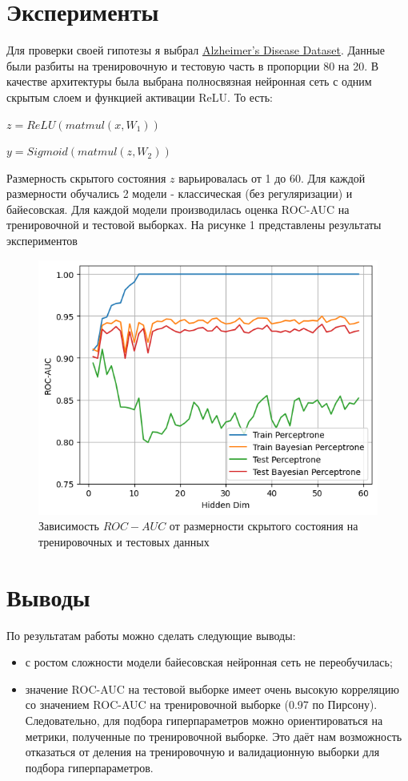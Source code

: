 \documentclass{article}
\begin{document}
\section{Эксперименты}

Для проверки своей гипотезы я выбрал \href{https://www.kaggle.com/datasets/rabieelkharoua/alzheimers-disease-dataset}{Alzheimer's Disease Dataset}. Данные были разбиты на тренировочную и тестовую часть в пропорции 80 на 20. В качестве архитектуры была выбрана полносвязная нейронная сеть с одним скрытым слоем и функцией активации ReLU. То есть:

$z = ReLU(matmul(x, W_1))$

$y = Sigmoid(matmul(z, W_2))$

Размерность скрытого состояния $z$ варьировалась от 1 до 60. Для каждой размерности обучались 2 модели - классическая (без регуляризации) и байесовская. Для каждой модели производилась оценка ROC-AUC на тренировочной и тестовой выборках. На рисунке 1 представлены результаты экспериментов

\begin{figure}
    \centering
    \includegraphics[width=1\linewidth]{roc_auc.png}
    \caption{Зависимость $ROC-AUC$ от размерности скрытого состояния на тренировочных и тестовых данных}
    \label{fig:enter-label}
\end{figure}

\section{Выводы}
По результатам работы можно сделать следующие выводы:
\begin{itemize}
    \item с ростом сложности модели байесовская нейронная сеть не переобучилась;
    \item значение ROC-AUC на тестовой выборке имеет очень высокую корреляцию со значением ROC-AUC на тренировочной выборке (0.97 по Пирсону). Следовательно, для подбора гиперпараметров можно ориентироваться на метрики, полученные по тренировочной выборке. Это даёт нам возможность отказаться от деления на тренировочную и валидационную выборки для подбора гиперпараметров.
\end{itemize}
\end{document}
